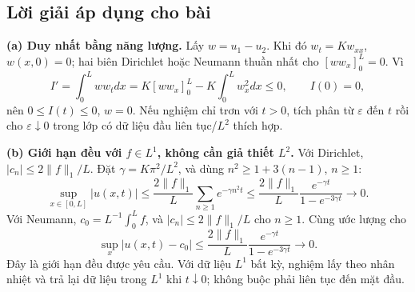 \documentclass[10pt,a4paper]{article}
\begin{document}
\subsection*{Lời giải áp dụng cho bài}
\textbf{(a) Duy nhất bằng năng lượng.} Lấy $w=u_1-u_2$. Khi đó $w_t=Kw_{xx}$, $w(x,0)=0$; hai biên Dirichlet hoặc Neumann thuần nhất cho $[ww_x]_0^L=0$. Vì
\[I'=\int_0^Lww_tdx=K[ww_x]_0^L-K\int_0^Lw_x^2dx\le0,\qquad I(0)=0,\]
nên $0\le I(t)\le0$, $w=0$. Nếu nghiệm chỉ trơn với $t>0$, tích phân từ $\varepsilon$ đến $t$ rồi cho $\varepsilon\downarrow0$ trong lớp có dữ liệu đầu liên tục/$L^2$ thích hợp.

\textbf{(b) Giới hạn đều với $f\in L^1$, không cần giả thiết $L^2$.}
Với Dirichlet, $|c_n|\le2\|f\|_1/L$. Đặt $\gamma=K\pi^2/L^2$, và dùng $n^2\ge1+3(n-1)$, $n\ge1$:
\[\sup_{x\in[0,L]}|u(x,t)|
\le\frac{2\|f\|_1}L\sum_{n\ge1}e^{-\gamma n^2t}
\le\frac{2\|f\|_1}L\frac{e^{-\gamma t}}{1-e^{-3\gamma t}}
\longrightarrow0.\]
Với Neumann, $c_0=L^{-1}\int_0^Lf$, và $|c_n|\le2\|f\|_1/L$ cho $n\ge1$. Cùng ước lượng cho
\[\sup_x|u(x,t)-c_0|\le\frac{2\|f\|_1}L
\frac{e^{-\gamma t}}{1-e^{-3\gamma t}}\longrightarrow0.\]
Đây là giới hạn đều được yêu cầu. Với dữ liệu $L^1$ bất kỳ, nghiệm lấy theo nhân nhiệt và trả lại dữ liệu trong $L^1$ khi $t\downarrow0$; không buộc phải liên tục đến mặt đầu.
\end{document}
